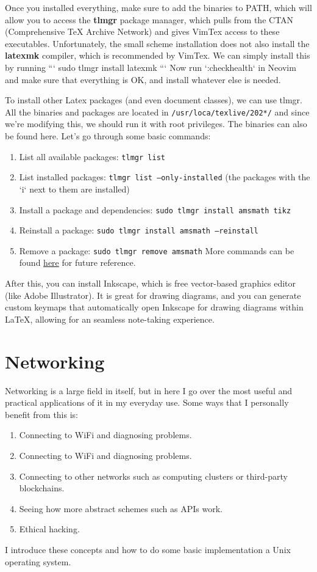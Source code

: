 \documentclass{article}
\begin{document}
  Once you installed everything, make sure to add the binaries to PATH, which will allow you to access the \textbf{tlmgr} package manager, which pulls from the CTAN (Comprehensive TeX Archive Network) and gives VimTex access to these executables. Unfortunately, the small scheme installation does not also install the \textbf{latexmk} compiler, which is recommended by VimTex. We can simply install this by running 
  ```
  sudo tlmgr install latexmk
  ```
  Now run `:checkhealth` in Neovim and make sure that everything is OK, and install whatever else is needed. 


  To install other Latex packages (and even document classes), we can use tlmgr. All the binaries and packages are located in \texttt{/usr/loca/texlive/202*/} and since we're modifying this, we should run it with root privileges. The binaries can also be found here. Let's go through some basic commands: 
  \begin{enumerate}
    \item List all available packages: \texttt{tlmgr list}
    \item List installed packages: \texttt{tlmgr list --only-installed} (the packages with the `i` next to them are installed)
    \item Install a package and dependencies: \texttt{sudo tlmgr install amsmath tikz} 
    \item Reinstall a package: \texttt{sudo tlmgr install amsmath --reinstall}
    \item Remove a package: \texttt{sudo tlmgr remove amsmath} 
  More commands can be found \href{http://tug.ctan.org/info/tlmgrbasics/doc/tlmgr.pdf}{here} for future reference.  
  \end{enumerate}

  After this, you can install Inkscape, which is free vector-based graphics editor (like Adobe Illustrator). It is great for drawing diagrams, and you can generate custom keymaps that automatically open Inkscape for drawing diagrams within LaTeX, allowing for an seamless note-taking experience.  
    
\section{Networking}

  Networking is a large field in itself, but in here I go over the most useful and practical applications of it in my everyday use. Some ways that I personally benefit from this is:

  \begin{enumerate}
    \item Connecting to WiFi and diagnosing problems.  
    \item Connecting to WiFi and diagnosing problems. 
    \item Connecting to other networks such as computing clusters or third-party blockchains.  
    \item Seeing how more abstract schemes such as APIs work. 
    \item Ethical hacking. 
  \end{enumerate}
  I introduce these concepts and how to do some basic implementation a Unix operating system.
\end{document}
